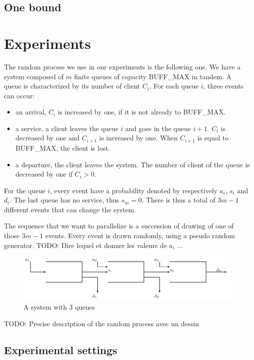 \documentclass[a4paper,10pt]{article}
\newcommand{\todo}[1]{{\color{red} TODO: {#1}}}
\begin{document}
\subsection{One bound}


\section{Experiments}

The random process we use in our experiments is the following one. We have a system composed of $m$ finite queues of capacity BUFF\_MAX in tandem. A queue is characterized by its number of client $C_i$.  For each queue $i$, three events can occur:
\begin{itemize}
\item an arrival, $C_i$ is increased by one, if it is not already to BUFF\_MAX.
\item a service, a client leaves the queue $i$ and goes in the queue $i+1$. $C_i$ is decreased by one and $C_{i+1}$ is increased by one. When $C_{i+1}$ is equal to BUFF\_MAX, the client is lost.
\item a departure, the client leaves the system. The number of client of the queue is decreased by one if $C_i >0$.
\end{itemize}

For the queue $i$, every event have a probability denoted by respectively $a_i$, $s_i$ and $d_i$. The last queue has no service, thus $s_m = 0 $. There is thus a total of $3m-1$ different events that can change the system.

The sequence that we want to parallelize is a succession of drawing of one of those $3m-1$ events. Every event is drawn randomly, using a pseudo random generator. \todo{Dire lequel et donner les valeurs de $a_i$ ...}

\begin{figure}
 \includegraphics[scale=0.75]{figures/tandem.pdf}
 \caption{A system with 3 queues}
\end{figure}

\todo{ Precise description of the random process avec un dessin}

\subsection{Experimental settings}
\end{document}

